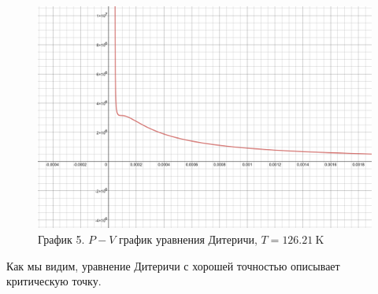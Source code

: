 \documentclass[a4paper]{article}
\numberwithin{equation}{subsection} %
\begin{document}
\begin{figure}[h!]
    \centering
        \includegraphics[width=\linewidth]{Graphics/Dieterici/126_21.png}
        \caption{\label{fig:clausius_1}График 5. $P-V$ график уравнения Дитеричи, $T = 126.21 \ \text{K}$}
\end{figure}
Как мы видим, уравнение Дитеричи с хорошей точностью описывает критическую точку.
\end{document}
